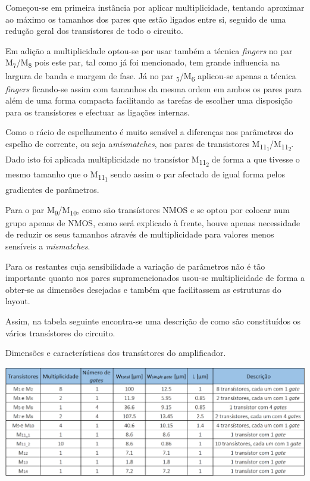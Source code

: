 \documentclass[11pt]{article}
\numberwithin{equation}{section}
\begin{document}
Começou-se em primeira instância por aplicar multiplicidade, tentando aproximar ao máximo os tamanhos dos pares que estão ligados entre si, seguido de uma redução geral dos transístores de todo o circuito. 

Em adição a multiplicidade optou-se por usar também a técnica \textit{fingers} no par M\textsubscript{7}/M\textsubscript{8} pois este par, tal como já foi mencionado, tem grande influencia na largura de banda e margem de fase. Já no par \textsubscript{5}/M\textsubscript{6} aplicou-se apenas a técnica \textit{fingers} ficando-se assim com tamanhos da mesma ordem em ambos os pares para além de uma forma compacta facilitando as tarefas de escolher uma disposição para os transístores e efectuar as ligações internas.

Como o rácio de espelhamento é muito sensível a diferenças nos parâmetros do espelho de corrente, ou seja a\textit{mismatches}, nos pares de transistores M\textsubscript{11\textsubscript{1}}/M\textsubscript{11\textsubscript{2}}. Dado isto foi aplicada multiplicidade no transístor M\textsubscript{11\textsubscript{2}} de forma a que tivesse o mesmo tamanho que o M\textsubscript{11\textsubscript{1}} sendo assim o par afectado de igual forma pelos gradientes de parâmetros.

Para o par M\textsubscript{9}/M\textsubscript{10}, como são transístores NMOS e se optou por colocar num grupo apenas de NMOS, como será explicado à frente, houve apenas necessidade de reduzir os seus tamanhos através de multiplicidade para valores menos sensíveis a \textit{mismatches}.

Para os restantes cuja sensibilidade a variação de parâmetros não é tão importante quanto nos pares supramencionados usou-se multiplicidade de forma a obter-se as dimensões desejadas e também que facilitassem as estruturas do layout.

Assim, na tabela seguinte encontra-se uma descrição de como são constituídos os vários transístores do circuito.

\begin{table}[H]
	\centering
	\caption{Dimensões e características dos transístores do amplificador.}
	\vspace{-1.5mm}
	\includegraphics[keepaspectratio=true, scale=0.30]{teoricas/dimensoes2}
\end{table}
\end{document}
